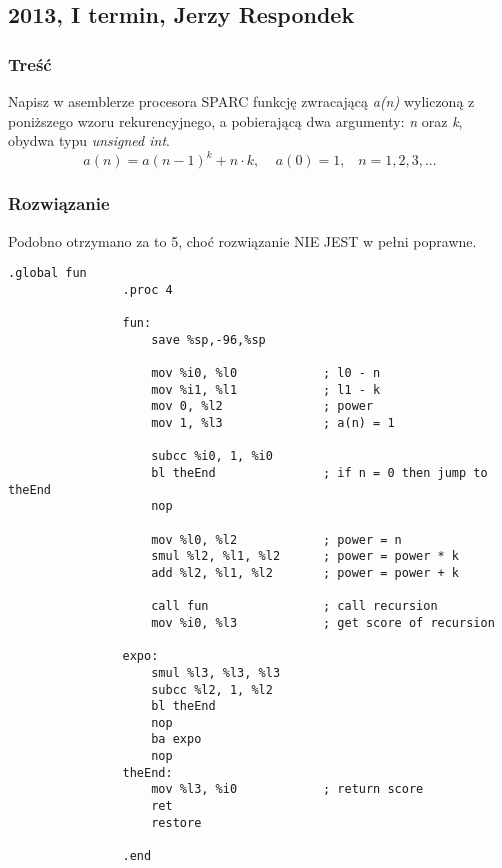 	\newpage
	\subsection{2013, I termin, Jerzy Respondek}
		\subsubsection{Treść}
			Napisz w asemblerze procesora SPARC funkcję zwracającą \emph{a(n)} wyliczoną z poniższego wzoru rekurencyjnego, a pobierającą dwa argumenty: \emph{n} oraz \emph{k}, obydwa typu \textit{unsigned int}.
			$$ a(n)=a(n-1)^k+n\cdot k,\;\;\;\;a(0)=1,\;\;\;n=1,2,3,... $$
		\subsubsection{Rozwiązanie}
			Podobno otrzymano za to 5, choć rozwiązanie NIE JEST w pełni poprawne.
			\begin{lstlisting}[language={[sparc]Assembler}]
				.global fun
				.proc 4
				
				fun:
					save %sp,-96,%sp
					
					mov %i0, %l0			; l0 - n
					mov %i1, %l1			; l1 - k
					mov 0, %l2				; power
					mov 1, %l3				; a(n) = 1
					
					subcc %i0, 1, %i0
					bl theEnd				; if n = 0 then jump to theEnd
					nop
					
					mov %l0, %l2			; power = n
					smul %l2, %l1, %l2		; power = power * k
					add %l2, %l1, %l2		; power = power + k
					
					call fun				; call recursion
					mov %i0, %l3			; get score of recursion
				
				expo:
					smul %l3, %l3, %l3
					subcc %l2, 1, %l2
					bl theEnd
					nop
					ba expo
					nop
				theEnd:
					mov %l3, %i0			; return score
					ret
					restore
				
				.end
			\end{lstlisting}
		
		
		
		
		
		
		
		
		
		
		
		
		
		
		
		
		
		
		
		
		
		
		
		
		
		